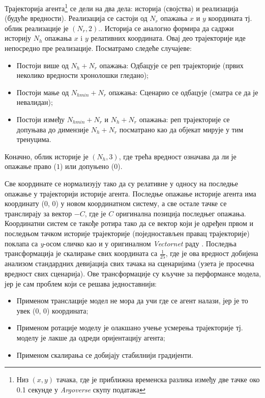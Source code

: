 \documentclass[11pt,oneside]{memoir}
\begin{document}
Трајекторија агента\footnote{Низ $(x, y)$ тачака, где је приближна временска разлика између две тачке око 0.1 секунде у \textit{Argoverse}
скупу података} 
се дели на два дела: историја (својства) и реализација (будуће вредности). Реализација се састоји од $N_r$ 
опажања $x$ и $y$ координата тј. облик реализације је $(N_r, 2)$.. 
Историја се аналогно формира да садржи историју $N_h$ опажања $x$ i $y$ релативних координата. Овај део трајекторије иде непосредно
пре реализације. Посматрамо следеће случајеве:
\begin{itemize}
  \item Постоји више од $N_h + N_r$ опажања: Одбацује се реп трајекторије (првих неколико вредности хронолошки гледано);
  \item Постоји мање од $N_{hmin} + N_r$ опажања: Сценарио се одбацује (сматра се да је невалидан);
  \item Постоји између $N_{hmin} + N_r$ и $N_h + N_r$ опажања: реп трајекторије се допуњава до димензије $N_h + N_r$ 
  посматрано као да објекат мирује у тим тренуцима.
\end{itemize}
Коначно, облик историје је $(N_h, 3)$, где трећа вредност означава да ли је опажање право ($1$) или допуњено ($0$).

Све координате се нормализују тако да су релативне у односу на последње опажање у трајекторији историје агента. Последње опажање историје
агента има координату (0, 0) у новом координатном систему, а све остале тачке се транслирају за вектор $-C$, где је $C$ оригинална позиција
последњег опажања. Координатни систем се такође ротира тако да се вектор који је одређен првом и последњом тачком историје трајекторије 
(поједностављен правац трајекторије) поклапа са \textit{y}-осом сличко као и у оригиналном \textit{Vectornet} раду \cite{vectornet}. Последња
трансформација је скалирање свих координата са $\frac{1}{25}$, где је ова вредност добијена анализом стандардних девијација свих тачака
на сценаријима (узета је просечна вредност свих сценарија). Ове трансформације су кључне за перформансе модела, јер је сам проблем који се решава
једноставнији:
\begin{itemize}
  \item Применом транслације модел не мора да учи где се агент налази, јер је то увек (0, 0) координата;
  \item Применом ротације моделу је олакшано учење усмерења трајекторије тј. моделу је лакше да одреди оријентацију агента;
  \item Применом скалирања се добијају стабилнији градијенти.
\end{itemize}
\end{document}
